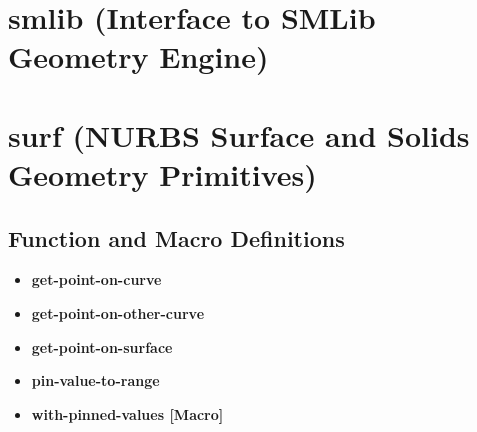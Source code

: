 \documentclass [11pt]{book}
\begin{document}
\section{smlib (Interface to SMLib Geometry Engine)}

\label{sec:smlib(interfacetosmlibgeometryengine)}







\section{surf (NURBS Surface and Solids Geometry Primitives)}

\label{sec:surf(nurbssurfaceandsolidsgeometryprimitives)}





\subsection{Function and Macro Definitions}

\label{subsec:functionandmacrodefinitions}



\begin{itemize}

\item {}
\label{prim:get-point-on-curve}
\textbf{get-point-on-curve}





\item {}
\label{prim:get-point-on-other-curve}
\textbf{get-point-on-other-curve}





\item {}
\label{prim:get-point-on-surface}
\textbf{get-point-on-surface}





\item {}
\label{prim:pin-value-to-range}
\textbf{pin-value-to-range}





\item {}
\label{prim:with-pinned-values}
\textbf{with-pinned-values [Macro]}





\end{itemize}
\end{document}
